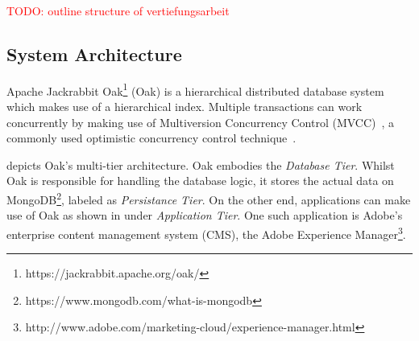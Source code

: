 \documentclass[abstracton,12pt]{scrartcl}
\theoremstyle{definition}
\begin{document}
\textcolor{red}{TODO: outline structure of vertiefungsarbeit}

\subsection{System Architecture}

Apache Jackrabbit Oak\footnote{https://jackrabbit.apache.org/oak/} (Oak) is a hierarchical distributed database system which makes use of a hierarchical index. 
Multiple transactions can work concurrently by making use of Multiversion Concurrency Control (MVCC)~\cite{GW02}, a commonly used optimistic concurrency control technique~\cite{TM11}.

 depicts Oak's multi-tier architecture.
Oak embodies the \textit{Database Tier}.
Whilst Oak is responsible for handling the database logic, it stores the actual data on MongoDB\footnote{https://www.mongodb.com/what-is-mongodb}, labeled as \textit{Persistance Tier}.
On the other end, applications can make use of Oak as shown in  under \textit{Application Tier}.
One such application is Adobe's enterprise content management system (CMS), the Adobe Experience Manager\footnote{http://www.adobe.com/marketing-cloud/experience-manager.html}.
\end{document}
